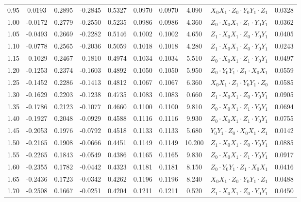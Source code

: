 \begin{tabular}{c|c|c|c|c|c|c|c|c|c}
0.95 & 0.0193 & 0.2895 & -0.2845 & 0.5327 & 0.0970 & 0.0970 & 4.090 & $X_0 X_1 \cdot Z_0 \cdot Y_0 Y_1 \cdot Z_1$ & 0.0328 \\
1.00 & -0.0172 & 0.2779 & -0.2550 & 0.5235 & 0.0986 & 0.0986 & 4.360 & $Z_0 \cdot X_0 X_1 \cdot Z_1 \cdot Y_0 Y_1$ & 0.0362 \\
1.05 & -0.0493 & 0.2669 & -0.2282 & 0.5146 & 0.1002 & 0.1002 & 4.650 & $Z_1 \cdot X_0 X_1 \cdot Z_0 \cdot Y_0 Y_1$ & 0.0405 \\
1.10 & -0.0778 & 0.2565 & -0.2036 & 0.5059 & 0.1018 & 0.1018 & 4.280 & $Z_1 \cdot X_0 X_1 \cdot Z_0 \cdot Y_0 Y_1$ & 0.0243 \\
1.15 & -0.1029 & 0.2467 & -0.1810 & 0.4974 & 0.1034 & 0.1034 & 5.510 & $Z_0 \cdot X_0 X_1 \cdot Z_1 \cdot Y_0 Y_1$ & 0.0497 \\
1.20 & -0.1253 & 0.2374 & -0.1603 & 0.4892 & 0.1050 & 0.1050 & 5.950 & $Z_0 \cdot Y_0 Y_1 \cdot Z_1 \cdot X_0 X_1$ & 0.0559 \\
1.25 & -0.1452 & 0.2286 & -0.1413 & 0.4812 & 0.1067 & 0.1067 & 6.360 & $X_0 X_1 \cdot Z_1 \cdot Y_0 Y_1 \cdot Z_0$ & 0.0585 \\
1.30 & -0.1629 & 0.2203 & -0.1238 & 0.4735 & 0.1083 & 0.1083 & 0.660 & $Z_1 \cdot X_0 X_1 \cdot Z_0 \cdot Y_0 Y_1$ & 0.0905 \\
1.35 & -0.1786 & 0.2123 & -0.1077 & 0.4660 & 0.1100 & 0.1100 & 9.810 & $Z_0 \cdot X_0 X_1 \cdot Z_1 \cdot Y_0 Y_1$ & 0.0694 \\
1.40 & -0.1927 & 0.2048 & -0.0929 & 0.4588 & 0.1116 & 0.1116 & 9.930 & $Z_0 \cdot X_0 X_1 \cdot Z_1 \cdot Y_0 Y_1$ & 0.0755 \\
1.45 & -0.2053 & 0.1976 & -0.0792 & 0.4518 & 0.1133 & 0.1133 & 5.680 & $Y_0 Y_1 \cdot Z_0 \cdot X_0 X_1 \cdot Z_1$ & 0.0142 \\
1.50 & -0.2165 & 0.1908 & -0.0666 & 0.4451 & 0.1149 & 0.1149 & 10.200 & $Z_1 \cdot X_0 X_1 \cdot Z_0 \cdot Y_0 Y_1$ & 0.0885 \\
1.55 & -0.2265 & 0.1843 & -0.0549 & 0.4386 & 0.1165 & 0.1165 & 9.830 & $Z_0 \cdot X_0 X_1 \cdot Z_1 \cdot Y_0 Y_1$ & 0.0917 \\
1.60 & -0.2355 & 0.1782 & -0.0442 & 0.4323 & 0.1181 & 0.1181 & 8.150 & $Z_0 \cdot Y_0 Y_1 \cdot Z_1 \cdot X_0 X_1$ & 0.0416 \\
1.65 & -0.2436 & 0.1723 & -0.0342 & 0.4262 & 0.1196 & 0.1196 & 8.240 & $X_0 X_1 \cdot Z_0 \cdot Y_0 Y_1 \cdot Z_1$ & 0.0488 \\
1.70 & -0.2508 & 0.1667 & -0.0251 & 0.4204 & 0.1211 & 0.1211 & 0.520 & $Z_1 \cdot X_0 X_1 \cdot Z_0 \cdot Y_0 Y_1$ & 0.0450 \\

\end{tabular}
